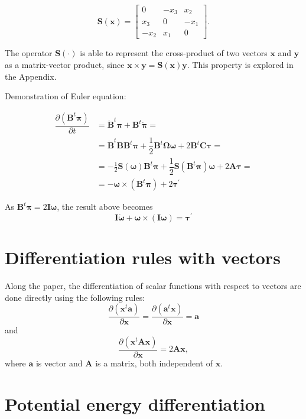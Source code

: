 \documentclass[aip,jcp,reprint,amsmath,amssymb,amsfont]{revtex4-1}
\newcommand{\mt}[1]{\boldsymbol{\mathbf{#1}}}           %
\newcommand{\vt}[1]{\boldsymbol{\mathbf{#1}}}           %
\newcommand{\tr}[1]{#1^t}                               %
\newcommand{\diff}[2]{\dfrac{\partial #1}{\partial #2}} %
\begin{document}
\begin{equation}
\label{eq:operator_S}
\mt S(\vt x) = \left[ \begin{array}{ccc}
0   & -x_3 &  x_2 \\
x_3 &  0   & -x_1 \\
-x_2 &  x_1 &  0
\end{array}\right].
\end{equation}

The operator  $\mt S(\cdot)$ is able to represent the cross-product of two vectors $\vt x$ and $\vt y$ as a matrix-vector product, since $\vt x \times \vt y = \mt S(\vt x)\vt y$. This property is explored in the Appendix.

Demonstration of Euler equation:

\begin{align*}
\diff{(\tr{\mt B}\vt \pi)}{t} &= \tr{\dot{\mt B}}\vt \pi + \tr{\mt B}\dot{\vt \pi} = \\
&=\tr{\dot{\mt B}}{\mt B}\tr{\mt B}{\vt \pi}  + \dfrac{1}{2} \tr{\mt B}\mt \Omega \vt \omega + 2 \tr{\mt B}\mt C \vt \tau = \\
&= -\frac{1}{2}{\mt S}(\vt \omega)\tr{\mt B}{\vt \pi} + \dfrac{1}{2} {\mt S}(\tr{\mt B}\mt \pi) \vt \omega + 2 \mt A \vt \tau = \\
&= - \vt \omega \times (\tr{\mt B}{\vt \pi}) + 2 {\vt \tau}^\prime
\end{align*}

As $\tr{\mt B}\vt \pi = 2 \mt I \vt \omega$, the result above becomes
\[
\mt I \dot{\vt \omega} + \vt \omega \times (\mt I \vt \omega) = {\vt \tau}^\prime
\]

\section{\label{sec:Diff_Rules}Differentiation rules with vectors}

Along the paper, the differentiation of scalar functions with respect to vectors are done directly using the following rules:
\[
\diff{(\tr{\vt x}\vt a)}{\vt x} = \diff{(\tr{\vt a}\vt x)}{\vt x} = \vt a
\]
and
\[
\diff{(\tr{\vt x}\mt A \vt x)}{\vt x} = 2 \mt A \vt x,
\]
where $\vt a$ is vector and $\mt A$ is a matrix, both independent of $\vt x$.

\section{\label{sec:Diff_PotEng}Potential energy differentiation}
\end{document}
